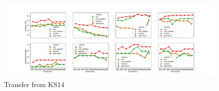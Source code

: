 \begin{figure}[t]
  \centering
    \includegraphics[width=\textwidth]{supplement/figures/KS14-transfer}
    \caption{Transfer from KS14}
    \label{fig:ks14-transfer}
\end{figure}

